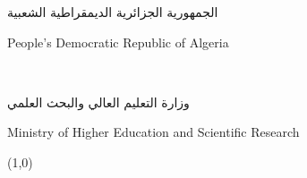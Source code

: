 




\begin{titlepage}
	
	\begin{center}


		
			\begin{Arabic}
				\Large {	الجمهورية الجزائرية الديمقراطية الشعبية}
			
		\end{Arabic} 
			\Large {
			
			People's Democratic Republic of Algeria  } \\ 
			 
					\begin{Arabic}
			\Large {	وزارة التعليم العالي والبحث العلمي}
			
		\end{Arabic} 
			
		\large{Ministry of Higher Education and Scientific Research   } \\ 
		

		
		
	\vspace{5mm}

	\begin{table}[h]
		\centering
		\setlength{\extrarowheight}{1pt}
	\line(1,0){\textwidth}\\ 
	\vspace{1mm}
		\begin{tabular}{ ccc }
			

\end{tabular}
\end{table}
\end{center}
\end{titlepage}
